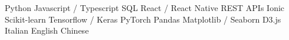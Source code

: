 
\skilltabular
{                  {Python}                {Javascript / Typescript}     {SQL}         {}  }
{      {React / React Native}  {REST APIs}                   {Ionic}       {}  }
{           {Scikit-learn}          {Tensorflow / Keras}          {PyTorch}     {}  }
{   {Pandas}                {Matplotlib / Seaborn}        {D3.js}       {}  }
{              {Italian}               {English}                     {Chinese}     {}  }